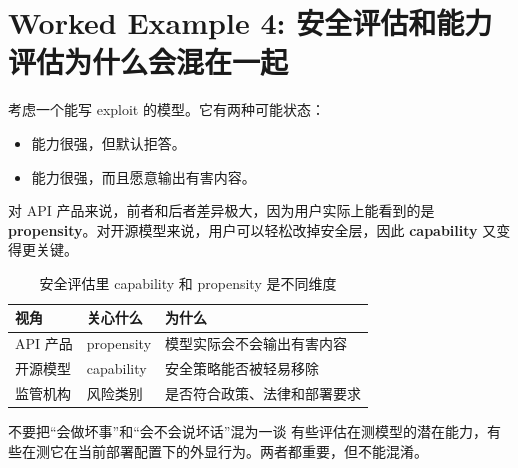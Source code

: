 \section{Worked Example 4: 安全评估和能力评估为什么会混在一起}

考虑一个能写 exploit 的模型。它有两种可能状态：
\begin{itemize}
    \item 能力很强，但默认拒答。
    \item 能力很强，而且愿意输出有害内容。
\end{itemize}

对 API 产品来说，前者和后者差异极大，因为用户实际上能看到的是 \textbf{propensity}。对开源模型来说，用户可以轻松改掉安全层，因此 \textbf{capability} 又变得更关键。

\begin{table}[H]
\centering
\begin{tabular}{p{3.0cm}p{4.2cm}p{5.8cm}}
\toprule
\textbf{视角} & \textbf{关心什么} & \textbf{为什么} \\
\midrule
API 产品 & propensity & 模型实际会不会输出有害内容 \\
开源模型 & capability & 安全策略能否被轻易移除 \\
监管机构 & 风险类别 & 是否符合政策、法律和部署要求 \\
\bottomrule
\end{tabular}
\caption{安全评估里 capability 和 propensity 是不同维度}
\end{table}

\begin{warningbox}{不要把“会做坏事”和“会不会说坏话”混为一谈}
有些评估在测模型的潜在能力，有些在测它在当前部署配置下的外显行为。两者都重要，但不能混淆。
\end{warningbox}

